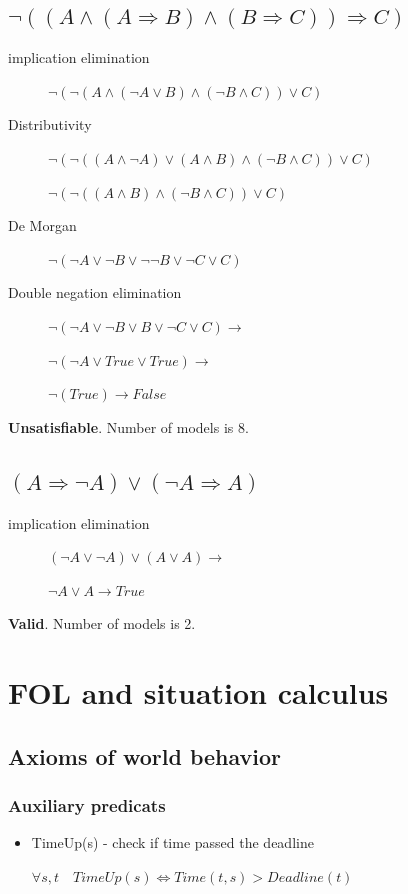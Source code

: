 \documentclass{article}                     %
\newcommand{\nt}[1]{\neg #1}
\begin{document}
	\subsection{$ \neg ((A \land (A \Rightarrow B) \land (B \Rightarrow C)) \Rightarrow C )$}
	\begin{description}
		\item[implication elimination] 	$ \neg (\neg(A \land (\nt{A} \lor B) \land (\nt{B} \land C)) \lor C )$
		\item[Distributivity]  $ \neg (\neg((A \land \nt{A}) \lor (A \land B) \land (\nt{B} \land C)) \lor C )$
		
		$ \neg (\neg((A \land B) \land (\nt{B} \land C)) \lor C )$
		\item[De Morgan] 		$ \neg (\nt{A} \lor \nt{B} \lor \nt{\nt{B}} \lor \nt{C} \lor C )$
		\item[Double negation elimination] $ \neg (\nt{A} \lor \nt{B} \lor B \lor \nt{C} \lor C ) \rightarrow $
		
		$ \neg (\nt{A} \lor True \lor True ) \rightarrow$
		
		$ \neg (True) \rightarrow False$
	\end{description}

	\textbf{Unsatisfiable}.  Number of models is 8.
	
	\subsection{$ (A\Rightarrow \nt{A}) \lor (\nt{A} \Rightarrow A) $}
		\begin{description}
		\item[implication elimination] $ (\nt{A} \lor \nt{A}) \lor (A \lor A) \rightarrow $
		
		$ \nt{A} \lor A \rightarrow True$
		
	\end{description}

	\textbf{Valid}.  Number of models is 2.
	
	
	\section{FOL and situation calculus}		

	\subsection{Axioms of world behavior}
	
	\subsubsection{Auxiliary predicats }
	\begin{itemize}
		\item TimeUp(s) - check if time passed the deadline
		
		$ \forall s, t \quad TimeUp(s) \Leftrightarrow Time(t, s) > Deadline(t) $
	\end{itemize}
\end{document}
